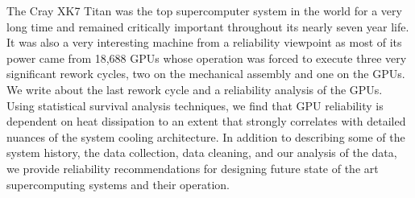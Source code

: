 
The Cray XK7 Titan was the top supercomputer system in the world for a
very long time and remained critically important throughout its nearly
seven year life. It was also a very interesting machine from a
reliability viewpoint as most of its power came from 18,688 GPUs whose
operation was forced to execute three very significant rework cycles,
two on the mechanical assembly and one on the GPUs. We write about the
last rework cycle and a reliability analysis of the GPUs. Using
statistical survival analysis techniques, we find that GPU reliability
is dependent on heat dissipation to an extent that strongly correlates
with detailed nuances of the system cooling architecture. In addition
to describing some of the system history, the data collection, data
cleaning, and our analysis of the data, we provide reliability
recommendations for designing future state of the art supercomputing
systems and their operation.
